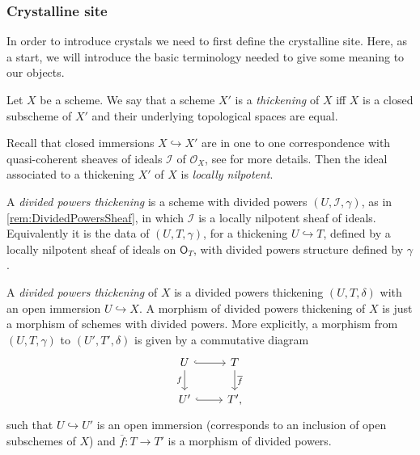 \documentclass[../Main]{subfiles}
\begin{document}
\subsubsection{Crystalline site}
In order to introduce crystals we need to first define the crystalline site.
Here, as a start, we will introduce the basic terminology needed to give
some meaning to our objects.


\begin{defn}[Thickening]
	Let $X$ be a scheme.
	We say that a scheme $X'$ is a {\em thickening} of $X$ iff
	$X$ is a closed subscheme of $X'$ and their underlying topological
	spaces are equal.
\end{defn}


\begin{rem}[]
	Recall that closed immersions $X \hookrightarrow X'$ are in one to
	one correspondence with quasi-coherent sheaves of ideals
	$\mathcal{I}$ of $\mathcal{O}_{ X }$, see
	\cite[\href{https://stacks.math.columbia.edu/tag/01QN}{Section 01QN}]{SP}
	for more details.
	Then the ideal associated to a thickening $X'$ of $X$ 
	is {\em locally nilpotent}.
\end{rem}


\begin{defn}
	A {\em divided powers thickening} is a scheme with divided powers
	$\left(U, \mathcal{I}, \gamma\right)$, as in \cref{rem:DividedPowersSheaf},
	in which $\mathcal{I}$ is a locally nilpotent sheaf of ideals.
	Equivalently it is the data of $\left(U, T, \gamma\right)$,
	for a thickening $U \hookrightarrow T$, defined by a locally nilpotent
	sheaf of ideals on $\mathsf{O}_T$, with divided powers structure
	defined by $\gamma$.
\end{defn}


\begin{defn}[]
	A {\em divided powers thickening} of $X$
	is a divided powers thickening $\left(U, T, \delta\right)$
	with an open immersion $U \hookrightarrow X$.
	A morphism of divided powers thickening of $X$ is just
	a morphism of schemes with divided powers.
	More explicitly, a morphism from $\left(U, T, \gamma\right)$
	to $\left(U', T', \delta\right)$ is given by a commutative
	diagram
	\begin{equation}\label{diag:MorphDivPowers}
	\begin{tikzcd}
		U \arrow[d, "f"', rightarrow] \arrow[r, "", hookrightarrow] &
		T \arrow[d, "\overline{f}", rightarrow] \\
		U' \arrow[r, "", hookrightarrow] &
		T'
	,\end{tikzcd}
	\end{equation}
	such that $U \hookrightarrow U'$ is an open immersion (corresponds to
	an inclusion of open subschemes of $X$) and
	$\overline{f}\colon T \to T'$ is a morphism of divided powers.
\end{defn}
\end{document}
